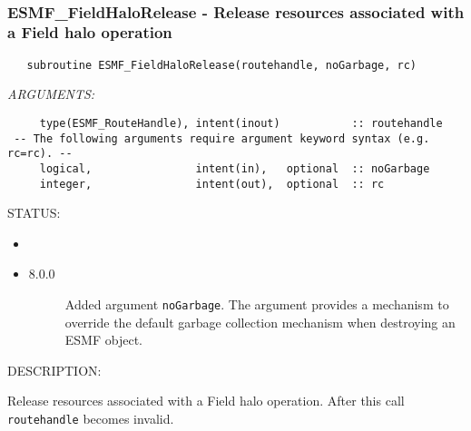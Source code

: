  
\mbox{}\hrulefill\ 
 
\subsubsection [ESMF\_FieldHaloRelease] {ESMF\_FieldHaloRelease - Release resources associated with a Field halo operation}


  
\begin{verbatim}   subroutine ESMF_FieldHaloRelease(routehandle, noGarbage, rc)\end{verbatim}{\em ARGUMENTS:}
\begin{verbatim}     type(ESMF_RouteHandle), intent(inout)           :: routehandle
 -- The following arguments require argument keyword syntax (e.g. rc=rc). --
     logical,                intent(in),   optional  :: noGarbage
     integer,                intent(out),  optional  :: rc\end{verbatim}
{\sf STATUS:}
   \begin{itemize}
   \item{}
   \item{}
   \begin{description}
   \item[8.0.0] Added argument {\tt noGarbage}.
     The argument provides a mechanism to override the default garbage collection
     mechanism when destroying an ESMF object.
   \end{description}
   \end{itemize}
  
{\sf DESCRIPTION:\\ }


     Release resources associated with a Field halo operation.
     After this call {\tt routehandle} becomes invalid.
  
